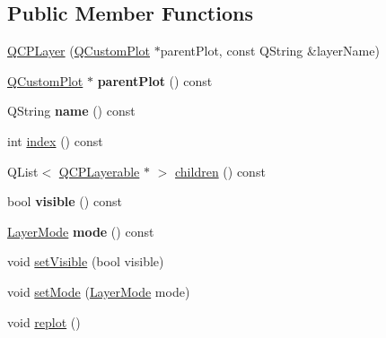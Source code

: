 \subsection*{Public Member Functions}
\begin{DoxyCompactItemize}
\item 
\hyperlink{class_q_c_p_layer_a5d0657fc86d624e5efbe930ef21af718}{Q\+C\+P\+Layer} (\hyperlink{class_q_custom_plot}{Q\+Custom\+Plot} $\ast$parent\+Plot, const Q\+String \&layer\+Name)
\item 
\mbox{\label{class_q_c_p_layer_a5520019787482e13857ebe631c27c3fa}} 
\hyperlink{class_q_custom_plot}{Q\+Custom\+Plot} $\ast$ {\bfseries parent\+Plot} () const
\item 
\mbox{\label{class_q_c_p_layer_a37806f662b50b588fb1029a14fc5ef50}} 
Q\+String {\bfseries name} () const
\item 
int \hyperlink{class_q_c_p_layer_ad322905c4700dcc7ceba63e011c730d2}{index} () const
\item 
Q\+List$<$ \hyperlink{class_q_c_p_layerable}{Q\+C\+P\+Layerable} $\ast$ $>$ \hyperlink{class_q_c_p_layer_a183b90941fc78f0b136edd77c5fb6966}{children} () const
\item 
\mbox{\label{class_q_c_p_layer_ad1cc2d6b32d2abb33c7f449b964e068c}} 
bool {\bfseries visible} () const
\item 
\mbox{\label{class_q_c_p_layer_a44ae50b011b19f3dd46a38d8e2e2c1b6}} 
\hyperlink{class_q_c_p_layer_a67dcfc1590be2a1f2227c5a39bb59c7c}{Layer\+Mode} {\bfseries mode} () const
\item 
void \hyperlink{class_q_c_p_layer_ac07671f74edf6884b51a82afb2c19516}{set\+Visible} (bool visible)
\item 
void \hyperlink{class_q_c_p_layer_a938d57b04f4e4c23cedf1711f983919b}{set\+Mode} (\hyperlink{class_q_c_p_layer_a67dcfc1590be2a1f2227c5a39bb59c7c}{Layer\+Mode} mode)
\item 
void \hyperlink{class_q_c_p_layer_adefd53b6db02f470151c416f42e37180}{replot} ()
\end{DoxyCompactItemize}

